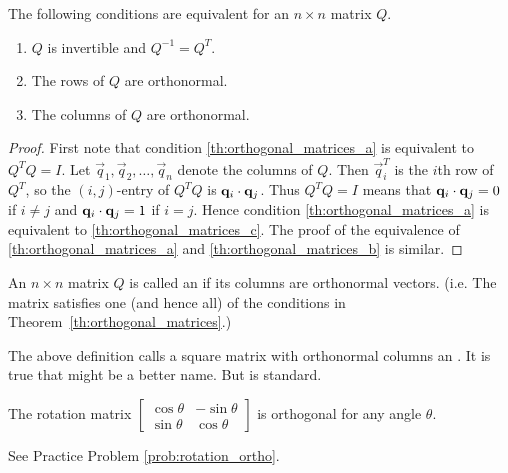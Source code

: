 \documentclass{ximera}
\begin{document}
\begin{theorem}\label{th:orthogonal_matrices}
The following conditions are equivalent for an $n \times n$ matrix $Q$.

\begin{enumerate}
\item\label{th:orthogonal_matrices_a} $Q$ is invertible and $Q^{-1} = Q^{T}$.

\item\label{th:orthogonal_matrices_b} The rows of $Q$ are orthonormal.

\item\label{th:orthogonal_matrices_c} The columns of $Q$ are orthonormal.

\end{enumerate}
\end{theorem}

\begin{proof}
First note that condition \ref{th:orthogonal_matrices_a} is equivalent to $Q^{T}Q = I$. Let $\vec{q}_{1}, \vec{q}_{2}, \dots, \vec{q}_{n}$ denote the columns of $Q$. Then $\vec{q}_{i}^{T}$ is the $i$th row of $Q^{T}$, so the $(i, j)$-entry of $Q^{T}Q$ is $\mathbf{q}_{i} \cdot \mathbf{q}_{j}$. Thus $Q^{T}Q = I$ means that $\mathbf{q}_{i} \cdot \mathbf{q}_{j} = 0$ if $i \neq j$ and $\mathbf{q}_{i} \cdot \mathbf{q}_{j} = 1$ if $i = j$. Hence condition \ref{th:orthogonal_matrices_a} is equivalent to \ref{th:orthogonal_matrices_c}. The proof of the equivalence of \ref{th:orthogonal_matrices_a} and \ref{th:orthogonal_matrices_b} is similar.
\end{proof}

\begin{definition}\label{def:orthogonal matrices}
An $n \times n$ matrix $Q$ is called an  if its columns are orthonormal vectors.  (i.e. The matrix satisfies one (and hence all) of the conditions in Theorem~\ref{th:orthogonal_matrices}.)
\end{definition}

\begin{remark}\label{rem:orthVsOrthnormMat}
The above definition calls a square matrix with orthonormal columns an .  It is true that  might be a better name. But  is standard.
\end{remark}


\begin{example}\label{ex:rotation_ortho}
The rotation matrix
$\begin{bmatrix}
\cos\theta & -\sin\theta \\
\sin\theta & \cos\theta
\end{bmatrix}$ is orthogonal for any angle $\theta$.
\begin{explanation}
See Practice Problem \ref{prob:rotation_ortho}.
\end{explanation}
\end{example}
\end{document}
